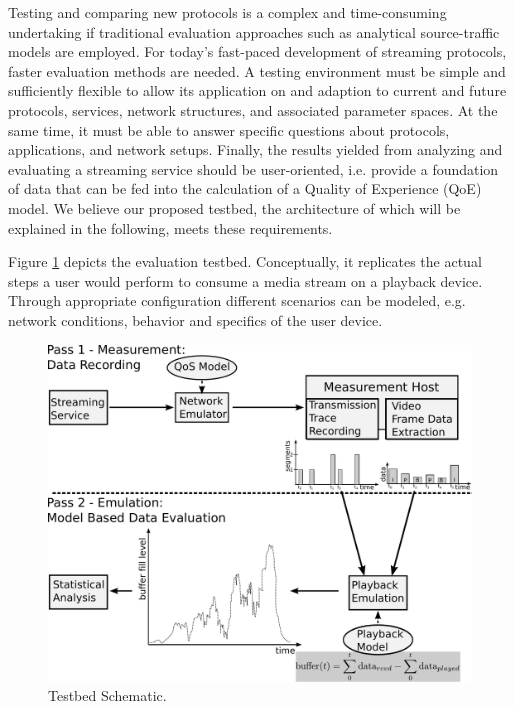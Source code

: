 Testing and comparing new protocols is a complex and time-consuming undertaking if traditional evaluation approaches such as analytical source-traffic models are employed. For today's fast-paced development of streaming protocols, faster evaluation methods are needed. A testing environment must be simple and sufficiently flexible to allow its application on and adaption to current and future protocols, services, network structures, and associated parameter spaces. 
At the same time, it must be able to answer specific questions about  protocols, applications, and network setups. Finally, the results yielded from analyzing and evaluating a streaming service should be user-oriented, i.e. provide a foundation of data that can be fed into the calculation of a Quality of Experience (QoE) model. We believe our proposed testbed, the architecture of which will be explained in the following, meets these requirements.



Figure \ref{fig:testbed} depicts the evaluation testbed. %
Conceptually, it replicates the actual steps a user would perform to consume a media stream on a playback device. Through appropriate configuration different scenarios can be modeled, e.g. network conditions, behavior and specifics of the user device.
 
 
\begin{figure}
\includegraphics[width=\columnwidth]{images/streaming/measurement-model.pdf}
\caption{Testbed Schematic.}
\label{fig:testbed}
\end{figure}

